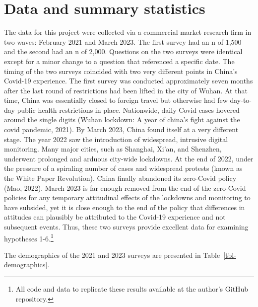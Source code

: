 \documentclass[
  letterpaper,
  DIV=11,
  numbers=noendperiod]{scrartcl}
\begin{document}
\section{Data and summary statistics}\label{sec-datasummary}

The data for this project were collected via a commercial market
research firm in two waves: February 2021 and March 2023. The first
survey had an n of 1,500 and the second had an n of 2,000. Questions on
the two surveys were identical except for a minor change to a question
that referenced a specific date. The timing of the two surveys coincided
with two very different points in China's Covid-19 experience. The first
survey was conducted approximately seven months after the last round of
restrictions had been lifted in the city of Wuhan. At that time, China
was essentially closed to foreign travel but otherwise had few
day-to-day public health restrictions in place. Nationwide, daily Covid
cases hovered around the single digits (Wuhan lockdown: A year of
china's fight against the covid pandemic, 2021). By March 2023, China
found itself at a very different stage. The year 2022 saw the
introduction of widespread, intrusive digital monitoring. Many major
cities, such as Shanghai, Xi'an, and Shenzhen, underwent prolonged and
arduous city-wide lockdowns. At the end of 2022, under the pressure of a
spiraling number of cases and widespread protests (known as the White
Paper Revolution), China finally abandoned its zero-Covid policy (Mao,
2022). March 2023 is far enough removed from the end of the zero-Covid
policies for any temporary attitudinal effects of the lockdowns and
monitoring to have subsided, yet it is close enough to the end of the
policy that differences in attitudes can plausibly be attributed to the
Covid-19 experience and not subsequent events. Thus, these two surveys
provide excellent data for examining hypotheses 1-6.\footnote{All code
  and data to replicate these results available at the author's GitHub
  repository.}

The demographics of the 2021 and 2023 surveys are presented in
Table~\ref{tbl-demographics}.
\end{document}
